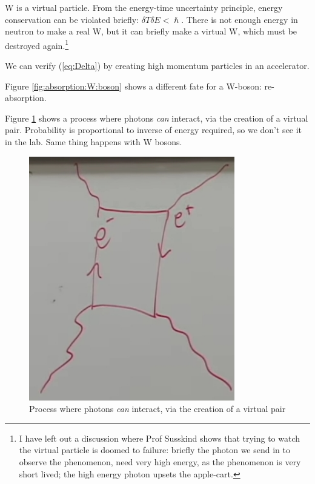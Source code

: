 \documentclass[]{article}
\begin{document}
 W is a virtual particle. From the energy-time uncertainty principle, energy conservation can be violated briefly: $\delta T \delta E<\hslash$. There is not enough energy in neutron to make a real W, but it can briefly make a virtual W, which must be destroyed again.\footnote{I have left out a discussion where Prof Susskind shows that trying to watch the virtual particle is doomed to failure: briefly the photon we send in to observe the phenomenon, need very high energy, as the phenomenon is very short lived; the high energy photon upsets the apple-cart.}
 
 We can verify (\ref{eq:Delta}) by creating high momentum particles in an accelerator.
 
 Figure \ref{fig:absorption:W:boson} shows a different fate for a W-boson: re-absorption.
 
 Figure \ref{fig:2-6-photons} shows a process where photons \emph{can} interact, via the creation of a virtual pair. Probability is proportional to inverse of energy required, so we don't see it in the lab. Same thing happens with W bosons.
 
 \begin{figure}[H]
 	\caption[Photon interaction via the creation of a virtual pair]{Process where photons \emph{can} interact, via the creation of a virtual pair}\label{fig:2-6-photons}
 	\includegraphics[width=0.8\textwidth]{2-6-photons}
 \end{figure}
\end{document}

